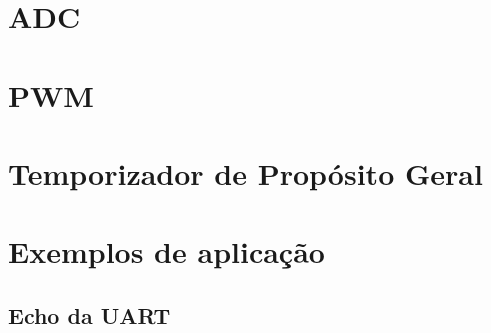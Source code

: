 \documentclass[a4paper,10pt,oneside]{book}
\begin{document}
\chapter{ADC}


\chapter{PWM}


\chapter{Temporizador de Propósito Geral}


\chapter{Exemplos de aplicação}

\section{Echo da UART}





\end{document}
